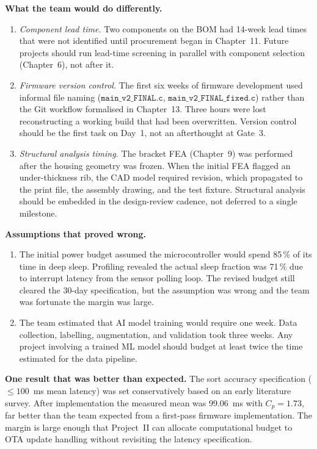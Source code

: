 \textbf{What the team would do differently.}
\begin{enumerate}
  \item \textit{Component lead time.} Two components on the BOM had 14-week
        lead times that were not identified until procurement began in
        Chapter~11.
        Future projects should run lead-time screening in parallel with
        component selection (Chapter~6), not after it.

  \item \textit{Firmware version control.} The first six weeks of firmware
        development used informal file naming ($\texttt{main\_v2\_FINAL.c}$,
        $\texttt{main\_v2\_FINAL\_fixed.c}$) rather than the Git workflow
        formalised in Chapter~13.
        Three hours were lost reconstructing a working build that had been
        overwritten.
        Version control should be the first task on Day~1, not an
        afterthought at Gate~3.

  \item \textit{Structural analysis timing.} The bracket FEA (Chapter~9)
        was performed after the housing geometry was frozen.
        When the initial FEA flagged an under-thickness rib, the CAD model
        required revision, which propagated to the print file, the assembly
        drawing, and the test fixture.
        Structural analysis should be embedded in the design-review cadence,
        not deferred to a single milestone.
\end{enumerate}

\textbf{Assumptions that proved wrong.}
\begin{enumerate}
  \item The initial power budget assumed the microcontroller would spend
        85\,\% of its time in deep sleep.
        Profiling revealed the actual sleep fraction was 71\,\% due to
        interrupt latency from the sensor polling loop.
        The revised budget still cleared the 30-day specification, but the
        assumption was wrong and the team was fortunate the margin was large.

  \item The team estimated that AI model training would require one week.
        Data collection, labelling, augmentation, and validation took three
        weeks.
        Any project involving a trained ML model should budget at least
        twice the time estimated for the data pipeline.
\end{enumerate}

\textbf{One result that was better than expected.}
The sort accuracy specification ($\leq 100$~ms mean latency) was set
conservatively based on an early literature survey.
After implementation the measured mean was 99.06~ms with $C_p = 1.73$,
far better than the team expected from a first-pass firmware implementation.
The margin is large enough that Project~II can allocate computational
budget to OTA update handling without revisiting the latency specification.

